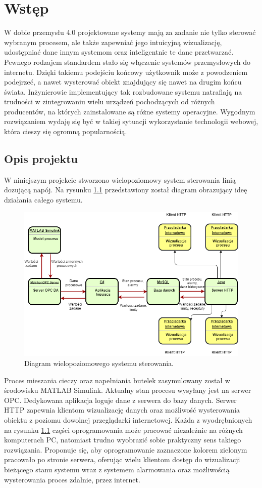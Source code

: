\chapter{Wstęp}
W dobie przemysłu 4.0 projektowane systemy mają za zadanie nie tylko sterować wybranym procesem, ale także zapewniać jego intuicyjną wizualizację, udostępniać dane innym systemom oraz inteligentnie te dane przetwarzać. Pewnego rodzajem standardem stało się włączenie systemów przemysłowych do internetu. Dzięki takiemu podejściu końcowy użytkownik może z powodzeniem podejrzeć, a nawet wysterować obiekt znajdujący się nawet na drugim końcu świata. Inżynierowie implementujący tak rozbudowane systemu natrafiają na trudności w zintegrowaniu wielu urządzeń pochodzących od różnych producentów, na których zainstalowane są różne systemy operacyjne. Wygodnym rozwiązaniem wydaję się być w takiej sytuacji wykorzystanie technologii webowej, która cieszy się ogromną popularnością.
\newpage
\section{Opis projektu}
W niniejszym projekcie stworzono wielopoziomowy system sterowania linią dozującą napój. Na rysunku \ref{fig:Diagram} przedstawiony został diagram obrazujący ideę działania całego systemu.
\begin{figure}[H]
	\centering
	\includegraphics[scale = 0.6]{fig/Diagram.png}
	\caption{Diagram wielopoziomowego systemu sterowania.}
	\label{fig:Diagram}
\end{figure}
Proces mieszania cieczy oraz napełniania butelek zasymulowany został w środowisku MATLAB Simulink. Aktualny stan procesu wysyłany jest na serwer OPC. Dedykowana aplikacja loguje dane z serwera do bazy danych. Serwer HTTP zapewnia klientom wizualizację danych oraz możliwość wysterowania obiektu z poziomu dowolnej przeglądarki internetowej. Każda z wyodrębnionych na rysunku \ref{fig:Diagram} części oprogramowania może pracować niezależnie na różnych komputerach PC, natomiast trudno wyobrazić sobie praktyczny sens takiego rozwiązania. Proponuje się, aby oprogramowanie zaznaczone kolorem zielonym pracowało po stronie serwera, oferując wielu klientom dostęp do wizualizacji bieżącego stanu systemu wraz z systemem alarmowania oraz możliwością wysterowania proces zdalnie, przez internet. 



